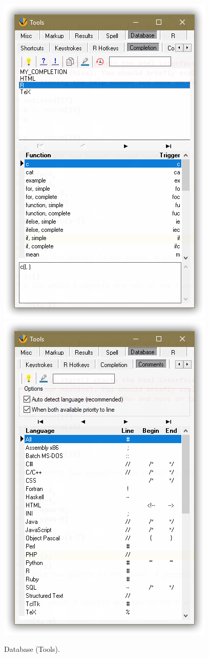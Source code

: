 \begin{figure}[H]
  \includegraphics[scale=0.35]{./res/tools_database_completion.png}~~
  \includegraphics[scale=0.35]{./res/tools_database_comments.png}\\
  \caption{Database (Tools).}
  \label{fig:tools_database}
\end{figure}

